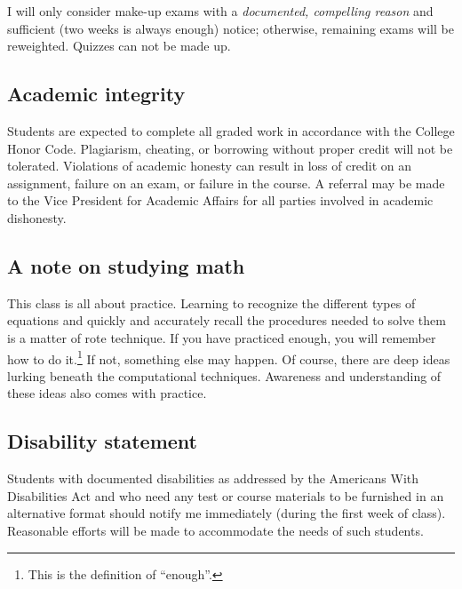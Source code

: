 \documentclass[symmetric]{tufte-handout}
\begin{document}
I will only consider make-up exams with a \emph{documented, compelling reason}
and sufficient (two weeks is always enough) notice; otherwise, remaining exams
will be reweighted.  Quizzes can not be made up.

\subsection{Academic integrity}

Students are expected to complete all graded work in accordance with the
College Honor Code. Plagiarism, cheating, or borrowing without proper credit
will not be tolerated.  Violations of academic honesty can result in loss of
credit on an assignment, failure on an exam, or failure in the course. A
referral may be made to the Vice President for Academic Affairs for all
parties involved in academic dishonesty.

\subsection{A note on studying math}

This class is all about practice. Learning to recognize the different types of
equations and quickly and accurately recall the procedures needed to solve
them is a matter of rote technique. If you have practiced enough, you will
remember how to do it.\footnote{This is the definition of “enough”.} If not,
something else may happen. Of course, there are deep ideas lurking beneath the
computational techniques. Awareness and understanding of these ideas also
comes with practice.

\subsection{Disability statement}

Students with documented disabilities as addressed by the Americans With
Disabilities Act and who need any test or course materials to be furnished in
an alternative format should notify me immediately (during the first week of
class).  Reasonable efforts will be made to accommodate the needs of such
students. 


\begin{fullwidth}
\end{fullwidth}
\end{document}
